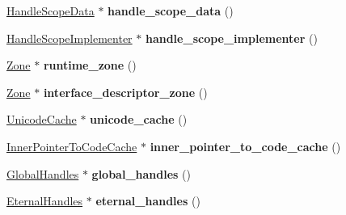 \begin{DoxyCompactItemize}
\item 
\hyperlink{structv8_1_1internal_1_1_handle_scope_data}{Handle\+Scope\+Data} $\ast$ {\bfseries handle\+\_\+scope\+\_\+data} ()\hypertarget{classv8_1_1internal_1_1_isolate_a89324c3550896825051b5db4ea1540b1}{}\label{classv8_1_1internal_1_1_isolate_a89324c3550896825051b5db4ea1540b1}

\item 
\hyperlink{classv8_1_1internal_1_1_handle_scope_implementer}{Handle\+Scope\+Implementer} $\ast$ {\bfseries handle\+\_\+scope\+\_\+implementer} ()\hypertarget{classv8_1_1internal_1_1_isolate_a324f1a0d4b1debe67ec40f05e0531cc0}{}\label{classv8_1_1internal_1_1_isolate_a324f1a0d4b1debe67ec40f05e0531cc0}

\item 
\hyperlink{classv8_1_1internal_1_1_zone}{Zone} $\ast$ {\bfseries runtime\+\_\+zone} ()\hypertarget{classv8_1_1internal_1_1_isolate_adb606ede4d19f0c7282d920907720dcc}{}\label{classv8_1_1internal_1_1_isolate_adb606ede4d19f0c7282d920907720dcc}

\item 
\hyperlink{classv8_1_1internal_1_1_zone}{Zone} $\ast$ {\bfseries interface\+\_\+descriptor\+\_\+zone} ()\hypertarget{classv8_1_1internal_1_1_isolate_a9a65086ce77f01cc7e39846446fa6d99}{}\label{classv8_1_1internal_1_1_isolate_a9a65086ce77f01cc7e39846446fa6d99}

\item 
\hyperlink{classv8_1_1internal_1_1_unicode_cache}{Unicode\+Cache} $\ast$ {\bfseries unicode\+\_\+cache} ()\hypertarget{classv8_1_1internal_1_1_isolate_a804b7f6512081a2d8b761dea90320e53}{}\label{classv8_1_1internal_1_1_isolate_a804b7f6512081a2d8b761dea90320e53}

\item 
\hyperlink{classv8_1_1internal_1_1_inner_pointer_to_code_cache}{Inner\+Pointer\+To\+Code\+Cache} $\ast$ {\bfseries inner\+\_\+pointer\+\_\+to\+\_\+code\+\_\+cache} ()\hypertarget{classv8_1_1internal_1_1_isolate_a99949749b070698fd4b2dab6a5bcf27d}{}\label{classv8_1_1internal_1_1_isolate_a99949749b070698fd4b2dab6a5bcf27d}

\item 
\hyperlink{classv8_1_1internal_1_1_global_handles}{Global\+Handles} $\ast$ {\bfseries global\+\_\+handles} ()\hypertarget{classv8_1_1internal_1_1_isolate_af83dc55d6b6ac38086fa181d110eeba6}{}\label{classv8_1_1internal_1_1_isolate_af83dc55d6b6ac38086fa181d110eeba6}

\item 
\hyperlink{classv8_1_1internal_1_1_eternal_handles}{Eternal\+Handles} $\ast$ {\bfseries eternal\+\_\+handles} ()\hypertarget{classv8_1_1internal_1_1_isolate_af528177ab1bb312657f39ee64bb19518}{}\label{classv8_1_1internal_1_1_isolate_af528177ab1bb312657f39ee64bb19518}


\end{DoxyCompactItemize}
